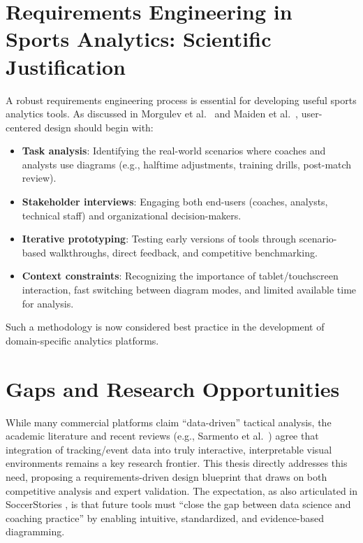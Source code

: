 \documentclass[11pt,a4paper,openright]{report}
\begin{document}
\section*{Requirements Engineering in Sports Analytics: Scientific Justification}
A robust requirements engineering process is essential for developing useful sports analytics tools. As discussed in Morgulev et al.\ \cite{morgulev2018sports} and Maiden et al.\ \cite{maiden2023designing}, user-centered design should begin with:
\begin{itemize}
    \item \textbf{Task analysis}: Identifying the real-world scenarios where coaches and analysts use diagrams (e.g., halftime adjustments, training drills, post-match review).
    \item \textbf{Stakeholder interviews}: Engaging both end-users (coaches, analysts, technical staff) and organizational decision-makers.
    \item \textbf{Iterative prototyping}: Testing early versions of tools through scenario-based walkthroughs, direct feedback, and competitive benchmarking.
    \item \textbf{Context constraints}: Recognizing the importance of tablet/touchscreen interaction, fast switching between diagram modes, and limited available time for analysis.
\end{itemize}
Such a methodology is now considered best practice in the development of domain-specific analytics platforms.

\section*{Gaps and Research Opportunities}
While many commercial platforms claim “data-driven” tactical analysis, the academic literature and recent reviews (e.g., Sarmento et al.\ \cite{sarmento2014match}) agree that integration of tracking/event data into truly interactive, interpretable visual environments remains a key research frontier. This thesis directly addresses this need, proposing a requirements-driven design blueprint that draws on both competitive analysis and expert validation. The expectation, as also articulated in SoccerStories \cite{perin2013soccerstories}, is that future tools must “close the gap between data science and coaching practice” by enabling intuitive, standardized, and evidence-based diagramming.

\end{document}
